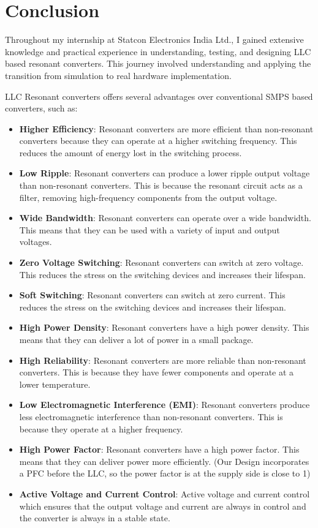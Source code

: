 \section{Conclusion}
Throughout my internship at Statcon Electronics India Ltd., I gained extensive
knowledge and practical experience in understanding, testing, and designing
LLC based resonant converters. This journey involved understanding and applying
the transition from simulation to real hardware implementation.

\noindent
LLC Resonant converters offers several advantages over conventional SMPS based
converters, such as:
\begin{itemize}
    \item \textbf{Higher Efficiency}: Resonant converters are more efficient than non-resonant converters because they can operate at a higher switching frequency. This reduces the amount of energy lost in the switching process.
    \item \textbf{Low Ripple}: Resonant converters can produce a lower ripple output voltage than non-resonant converters. This is because the resonant circuit acts as a filter, removing high-frequency components from the output voltage.
    \item \textbf{Wide Bandwidth}: Resonant converters can operate over a wide bandwidth. This means that they can be used with a variety of input and output voltages.
    \item \textbf{Zero Voltage Switching}: Resonant converters can switch at zero voltage. This reduces the stress on the switching devices and increases their lifespan.
    \item \textbf{Soft Switching}: Resonant converters can switch at zero current. This reduces the stress on the switching devices and increases their lifespan.
    \item \textbf{High Power Density}: Resonant converters have a high power density. This means that they can deliver a lot of power in a small package.
    \item \textbf{High Reliability}: Resonant converters are more reliable than non-resonant converters. This is because they have fewer components and operate at a lower temperature.
    \item \textbf{Low Electromagnetic Interference (EMI)}: Resonant converters produce less electromagnetic interference than non-resonant converters. This is because they operate at a higher frequency.
    \item \textbf{High Power Factor}: Resonant converters have a high power factor. This means that they can deliver power more efficiently. (Our Design incorporates a PFC before the LLC, so the power factor is at the supply side is close to 1)
    \item \textbf{Active Voltage and Current Control}: Active voltage and current control which ensures that the output voltage and current are always in control and the converter is always in a stable state.
\end{itemize}

